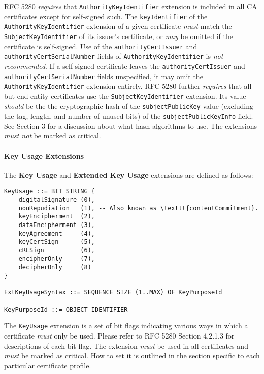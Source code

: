 RFC 5280 \textit{requires} that \texttt{AuthorityKeyIdentifier} extension is included in all CA certificates except for self-signed such.
The \texttt{keyIdentifier} of the \texttt{AuthorityKeyIdentifier} extension of a given certificate \textit{must} match the \texttt{SubjectKeyIdentifier} of its issuer's certificate, or \textit{may} be omitted if the certificate is self-signed.
Use of the \texttt{authorityCertIssuer} and \texttt{authorityCertSerialNumber} fields of \texttt{AuthorityKeyIdentifier} is \textit{not recommended}.
If a self-signed certificate leaves the \texttt{authorityCertIssuer} and \texttt{authorityCertSerialNumber} fields unspecified, it may omit the \texttt{AuthorityKeyIdentifier} extension entirely.
RFC 5280 further \textit{requires} that all but end entity certificates use the \texttt{SubjectKeyIdentifier} extension.
Its value \textit{should} be the the cryptographic hash of the \texttt{subjectPublicKey} value (excluding the tag, length, and number of unused bits) of the \texttt{subjectPublicKeyInfo} field.
See Section 3 for a discussion about what hash algorithms to use.
The extensions \textit{must not} be marked as critical.

\paragraph{Key Usage Extensions}

The \textbf{Key Usage} and \textbf{Extended Key Usage} extensions are defined as follows:

\begin{verbatim}
KeyUsage ::= BIT STRING {
    digitalSignature (0),
    nonRepudiation   (1), -- Also known as \texttt{contentCommitment}.
    keyEncipherment  (2),
    dataEncipherment (3),
    keyAgreement     (4),
    keyCertSign      (5),
    cRLSign          (6),
    encipherOnly     (7),
    decipherOnly     (8)
}

ExtKeyUsageSyntax ::= SEQUENCE SIZE (1..MAX) OF KeyPurposeId

KeyPurposeId ::= OBJECT IDENTIFIER
\end{verbatim}

The \texttt{KeyUsage} extension is a set of bit flags indicating various ways in which a certificate \textit{must} only be used.
Please refer to RFC 5280 Section 4.2.1.3 for descriptions of each bit flag.
The extension \textit{must} be used in all certificates and \textit{must} be marked as critical.
How to set it is outlined in the section specific to each particular certificate profile.

